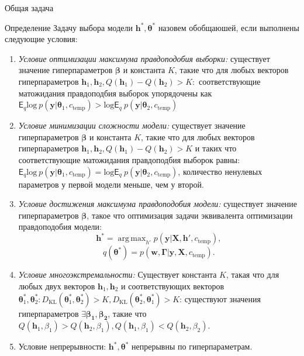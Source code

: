 \documentclass[usenames,dvipsnames,11pt,pdf,utf8,russian,aspectratio=43]{beamer}
\DeclareMathOperator*{\argmax}{arg\,max}
\begin{document}
                                                                                                              


   
\begin{frame}{Общая задача}
\tiny
\begin{block}{Определение}
Задачу выбора модели $\mathbf{h}^{*}, \boldsymbol{\theta}^{*}$ назовем обобщаюшей, если выполнены следующие условия:
\begin{enumerate}
\item \textit{Условие оптимизации максимума правдоподобия выборки:} существует значение гиперпараметров $\boldsymbol{\beta}$ и константа $K$, такие что для любых векторов гиперпараметров $\mathbf{h}_1, \mathbf{h}_2, Q(\mathbf{h}_1) - Q(\mathbf{h}_2) > K:$ соответствующие матожидания правдоподбия выборок упорядочены как $\mathsf{E}_q \text{log}~p(\mathbf{y}|\boldsymbol{\theta}_1, c_{\text{temp}})>\text{log}\mathsf{E}_q ~p(\mathbf{y}|\boldsymbol{\theta}_2, c_{\text{temp}})$

\item \textit{Условие минимизации сложности модели:} существует значение гиперпараметров $\boldsymbol{\beta}$ и константа $K$, такие что для любых векторов гиперпараметров $\mathbf{h}_1, \mathbf{h}_2, Q(\mathbf{h}_1) - Q(\mathbf{h}_2) > K$ и таких что  соответствующие матожидания правдоподбия выборок равны: $\mathsf{E}_q \text{log}~p(\mathbf{y}|\boldsymbol{\theta}_1, c_{\text{temp}}) = \text{log}\mathsf{E}_q ~p(\mathbf{y}|\boldsymbol{\theta}_2, c_{\text{temp}})$, количество ненулевых параметров у первой модели меньше, чем у второй.

\item \textit{Условие достижения максимума правдоподобия модели:} существует значение гиперпараметров $\boldsymbol{\beta}$, такое что оптимизация задачи эквивалента оптимизации правдоподобия модели:
\[
    \mathbf{h}^{*} = \argmax_{h'} p(\mathbf{y}|\mathbf{X}, \mathbf{h}', c_{\text{temp}}),
\]
\[
    q(\boldsymbol{\theta}^{*}) = p(\mathbf{w}, \boldsymbol{\Gamma}|\mathbf{y}, \mathbf{X}, c_{\text{temp}}).
\]

\item \textit{Условие многоэкстремальности:}
Существует константа $K$, такая что для любых двух векторов $\mathbf{h}_{1}, \mathbf{h}_2$ и соответствующих векторов $\boldsymbol{\theta}_1^{*},\boldsymbol{\theta}_2^{*}: D_\text{KL}(\boldsymbol{\theta}_1^{*}, \boldsymbol{\theta}_2^{*})>K, D_\text{KL}(\boldsymbol{\theta}_2^{*}, \boldsymbol{\theta}_1^{*})>K$:  существуют значения гиперпараметров $\exists \boldsymbol{\beta_1},\boldsymbol{\beta_2}$, такие что  $Q(\mathbf{h}_1, \beta_1) > Q(\mathbf{h}_2, \beta_1), Q(\mathbf{h}_1, \beta_1) < Q(\mathbf{h}_2, \beta_2)$.

\item Условие непрерывности: $\mathbf{h}^{*}, \boldsymbol{\theta}^{*}$ непрерывны по гиперпараметрам.

\end{enumerate}
\end{block}
\end{frame}
\end{document}

